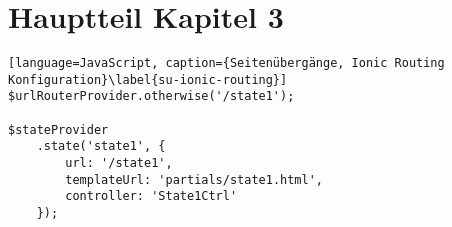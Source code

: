 \section{Hauptteil Kapitel 3}
\begin{lstlisting}[language=JavaScript, caption={Seitenübergänge, Ionic Routing Konfiguration}\label{su-ionic-routing}]
$urlRouterProvider.otherwise('/state1');

$stateProvider
	.state('state1', {
		url: '/state1',
		templateUrl: 'partials/state1.html',
		controller: 'State1Ctrl'
	});	
\end{lstlisting}